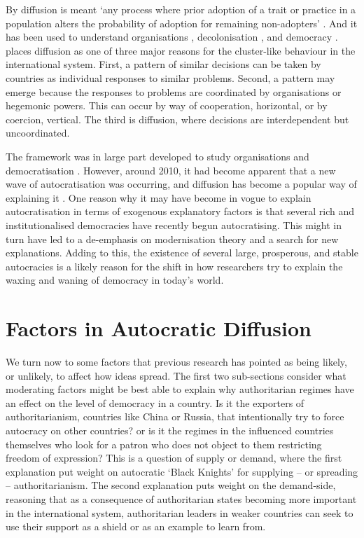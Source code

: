 By diffusion is meant `any process where prior adoption of a trait or practice in a population alters the probability of adoption for remaining non-adopters' \citep[p. 325]{strang_adding_1991}. And it has been used to understand organisations \citep{dimaggio_iron_1983}, decolonisation \citep{strang_adding_1991}, and democracy \citep{elkins_waves_2005}. \citet{elkins_waves_2005} places diffusion as one of three major reasons for the cluster-like behaviour in the international system. First, a pattern of similar decisions can be taken by countries as individual responses to similar problems. Second, a pattern may emerge because the responses to problems are coordinated by organisations or hegemonic powers. This can occur by way of cooperation, horizontal, or by coercion, vertical. The third is diffusion, where decisions are interdependent but uncoordinated. 

The framework was in large part developed to study organisations and democratisation \citep{elkins_waves_2005, dimaggio_iron_1983, huntington_third_1991}. However, around 2010, it had become apparent that a new wave of autocratisation was occurring, and diffusion has become a popular way of explaining it \citep{ambrosio_constructing_2010, gelman_authoritarian_2008, lankina_authoritarian_2016, weyland_autocratic_2017}. One reason why it may have become in vogue to explain autocratisation in terms of exogenous explanatory factors is that several rich and institutionalised democracies have recently begun autocratising. This might in turn have led to a de-emphasis on modernisation theory and a search for new explanations. Adding to this, the existence of several large, prosperous, and stable autocracies is a likely reason for the shift in how researchers try to explain the waxing and waning of democracy in today's world. 

\section{Factors in Autocratic Diffusion}
We turn now to some factors that previous research has pointed as being likely, or unlikely, to affect how ideas spread. The first two sub-sections consider what moderating factors might be best able to explain why authoritarian regimes have an effect on the level of democracy in a country. Is it the exporters of authoritarianism, countries like China or Russia, that intentionally try to force autocracy on other countries? or is it the regimes in the influenced countries themselves who look for a patron who does not object to them restricting freedom of expression? This is a question of supply or demand, where the first explanation put weight on autocratic `Black Knights' for supplying -- or spreading -- authoritarianism. The second explanation puts weight on the demand-side, reasoning that as a consequence of authoritarian states becoming more important in the international system, authoritarian leaders in weaker countries can seek to use their support as a shield or as an example to learn from. 

